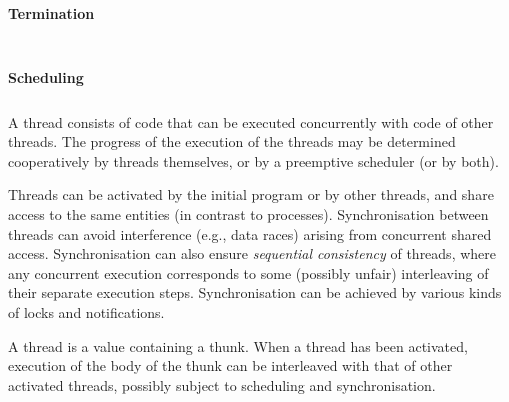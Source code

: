 \paragraph{Termination}\hypertarget{termination}{}\label{termination}

\begin{align*}
  [ \
  \KEY{Funcon} \quad & \NAMEREF{thread-terminate} \\
  \KEY{Funcon} \quad & \NAMEREF{is-thread-terminated} \\
  \KEY{Funcon} \quad & \NAMEREF{thread-value} \\
  \KEY{Funcon} \quad & \NAMEREF{thread-join} \\
  \KEY{Funcon} \quad & \NAMEREF{thread-exterminate}
  \ ]
\end{align*}
\paragraph{Scheduling}\hypertarget{scheduling}{}\label{scheduling}

\begin{align*}
  [ \
  \KEY{Funcon} \quad & \NAMEREF{update-thread-stepping} \\
  \KEY{Funcon} \quad & \NAMEREF{update-thread-schedule} \\
  \KEY{Funcon} \quad & \NAMEREF{current-thread-schedule} \\
  \KEY{Funcon} \quad & \NAMEREF{is-thread-preemptible} \\
  \KEY{Funcon} \quad & \NAMEREF{thread-preemptible} \\
  \KEY{Funcon} \quad & \NAMEREF{thread-cooperative}
  \ ]
\end{align*}
A thread consists of code that can be executed concurrently with code
of other threads. The progress of the execution of the threads may be
determined cooperatively by threads themselves, or by a preemptive
scheduler (or by both).

Threads can be activated by the initial program or by other threads, 
and share access to the same entities (in contrast to processes). 
Synchronisation between threads can avoid interference (e.g., data
races) arising from concurrent shared access. Synchronisation can also
ensure \emph{sequential consistency} of threads, where any concurrent
execution corresponds to some (possibly unfair) interleaving of their
separate execution steps. Synchronisation can be achieved by various
kinds of locks and notifications.

A thread is a value containing a thunk. When a thread has been activated,
execution of the body of the thunk can be interleaved with that of other
activated threads, possibly subject to scheduling and synchronisation.

